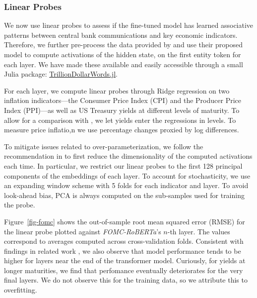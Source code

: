 \documentclass{article}
\theoremstyle{plain}
\theoremstyle{definition}
\theoremstyle{remark}
\begin{document}
\subsubsection{Linear Probes}\label{linear-probes}
We now use linear probes to assess if the fine-tuned model has learned associative patterns between central bank communications and key economic indicators. Therefore, we further pre-process the data provided by \citet{shah2023trillion} and use their proposed model to compute activations of the hidden state, on the first entity token for each layer. We have made these available and easily accessible through a small Julia package: \href{https://anonymous.4open.science/r/TrillionDollarWords/README.md}{TrillionDollarWords.jl}. 

For each layer, we compute linear probes through Ridge regression on two inflation indicators---the Consumer Price Index (CPI) and the Producer Price Index (PPI)---as well as US Treasury yields at different levels of maturity. To allow for a comparison with \citet{shah2023trillion}, we let yields enter the regressions in levels. To measure price inflatio,n we use percentage changes proxied by log differences.

To mitigate issues related to over-parameterization, we follow the recommendation in \citet{alain2018understanding} to first reduce the dimensionality of the computed activations each time. In particular, we restrict our linear probes to the first 128 principal components of the embeddings of each layer.
To account for stochasticity, we use an expanding window scheme with 5 folds for each indicator and layer. To avoid look-ahead bias, PCA is always computed on the sub-samples used for training the probe. 

Figure~\ref{fig-fomc} shows the out-of-sample root mean squared error (RMSE) for the linear probe plotted against \emph{FOMC-RoBERTa}'s \(n\)-th layer. The values correspond to averages computed across cross-validation folds. Consistent with findings in related work \citep{alain2018understanding,gurnee2023languagev2}, we also observe that model performance tends to be higher for layers near the end of the transformer model. Curiously, for yields at longer maturities, we find that perfomance eventually deteriorates for the very final layers. We do not observe this for the training data, so we attribute this to overfitting. 
\end{document}
